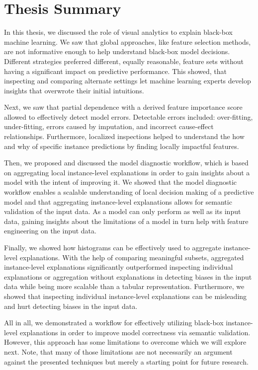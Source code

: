 \chapter{Thesis Summary}
\label{chap:summary}

In this thesis, we discussed the role of visual analytics to explain black-box machine learning.
We saw that global approaches, like feature selection methods, are not informative enough to help understand black-box model decisions.
Different strategies preferred different, equally reasonable, feature sets without having a significant impact on predictive performance.
This showed, that inspecting and comparing alternate settings let machine learning experts develop insights that overwrote their initial intuitions.

Next, we saw that partial dependence with a derived feature importance score allowed to effectively detect model errors.
Detectable errors included: over-fitting, under-fitting, errors caused by imputation, and incorrect cause-effect relationships.
Furthermore, localized inspections helped to understand the how and why of specific instance predictions by finding locally impactful features.

Then, we proposed and discussed the model diagnostic workflow, which is based on aggregating local instance-level explanations in order to gain insights about a model with the intent of improving it.
We showed that the model diagnostic workflow enables a scalable understanding of local decision making of a predictive model and that aggregating instance-level explanations allows for semantic validation of the input data.
As a model can only perform as well as its input data, gaining insights about the limitations of a model in turn help with feature engineering on the input data.

Finally, we showed how histograms can be effectively used to aggregate instance-level explanations.
With the help of comparing meaningful subsets, aggregated instance-level explanations significantly outperformed inspecting individual explanations or aggregation without explanations in detecting biases in the input data while being more scalable than a tabular representation.
Furthermore, we showed that inspecting individual instance-level explanations can be misleading and hurt detecting biases in the input data.

All in all, we demonstrated a workflow for effectively utilizing black-box instance-level explanations in order to improve model correctness via semantic validation.
However, this approach has some limitations to overcome which we will explore next.
Note, that many of those limitations are not necessarily an argument against the presented techniques but merely a starting point for future research.

